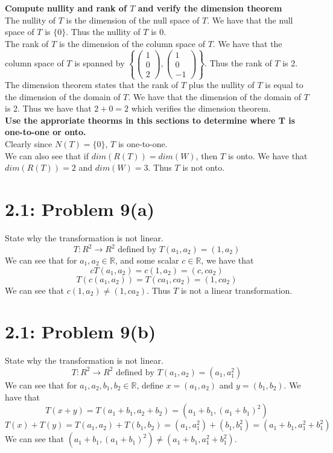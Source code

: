 \documentclass[answers,12pt,addpoints]{exam}
\begin{document}
\textbf{Compute nullity and rank of $T$ and verify the dimension theorem}\\
The nullity of $T$ is the dimension of the null space of $T$. We have that the null space of $T$ is $\{0\}$. Thus the nullity of $T$ is 0.\\
The rank of $T$ is the dimension of the column space of $T$. We have that the column space of $T$ is spanned by $\left\{ \begin{pmatrix}
1 \\ 0 \\ 2
\end{pmatrix}, \begin{pmatrix}
1 \\ 0 \\ -1
\end{pmatrix} \right\}$. Thus the rank of $T$ is 2.\\
The dimension theorem states that the rank of $T$ plus the nullity of $T$ is equal to the dimension of the domain of $T$. We have that the dimension of the domain of $T$ is 2. Thus we have that $2 + 0 = 2$ which verifies the dimension theorem.\\

\textbf{Use the approriate theorms in this sections to determine where T is one-to-one or onto.}\\
Clearly since $N(T) = \{0\}$, $T$ is one-to-one. \\
We can also see that if $dim(R(T)) = dim(W)$, then $T$ is onto. We have that $dim(R(T)) = 2$ and $dim(W) = 3$. Thus $T$ is not onto.\\

\section*{2.1: Problem 9(a)}
State why the transformation is not linear.\\
$$ T: R^2 \to R^2 \text{ defined by } T(a_1, a_2) = (1,a_2) $$
We can see that for $a_1, a_2 \in \mathds{R}$, and some scalar $c \in \mathds{R}$, we have that
$$ cT(a_1, a_2) = c(1, a_2) = (c, ca_2) $$
$$ T(c(a_1, a_2)) = T(ca_1, ca_2) = (1, ca_2) $$
We can see that $c(1, a_2) \neq (1, ca_2)$.
Thus $T$ is not a linear transformation.\\
\section*{2.1: Problem 9(b)}
State why the transformation is not linear.\\
$$ T: R^2 \to R^2 \text{ defined by } T(a_1, a_2) = (a_1, a_1^2) $$
We can see that for $a_1, a_2, b_1, b_2 \in \mathds{R}$, define $x = (a_1, a_2)$ and $y = (b_1, b_2)$. We have that
$$ T(x + y) = T(a_1 + b_1, a_2 + b_2) = (a_1 + b_1, (a_1 + b_1)^2) $$
$$ T(x) + T(y) = T(a_1, a_2) + T(b_1, b_2) = (a_1, a_1^2) + (b_1, b_1^2) = (a_1 + b_1, a_1^2 + b_1^2) $$
We can see that $(a_1 + b_1, (a_1 + b_1)^2) \neq (a_1 + b_1, a_1^2 + b_1^2)$.
\end{document}
